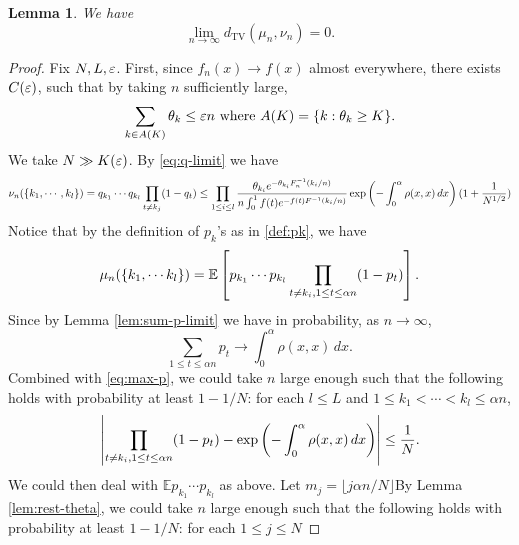 \documentclass[10pt]{article}
\DeclareMathOperator{\TV}{\mathrm{TV}}
\newtheorem{lem}[thm]{Lemma}
\numberwithin{equation}{section}
\begin{document}
    \begin{lem}
        We have 
        \begin{equation}
            \lim_{n\to \infty} d_{\TV} (\mu_n,\nu_n) =0.
        \end{equation}
    \end{lem}

    \begin{proof}
        Fix $N,L,\varepsilon$. 
        First, since $f_n(x)\to f(x)$ almost everywhere, there exists $C(\varepsilon)$, such that by taking $n$ sufficiently large, 
        \begin{equation}
            \sum_{k\in A(K)} \theta_k \leq \varepsilon n \mbox{ where } A(K)=\{k:\theta_k\geq K\}.
        \end{equation}
        We take $N\gg K(\varepsilon)$. By \eqref{eq:q-limit} we have
        \begin{equation}\label{eq:nu-nound}
            \nu_{n}(\{k_1,\cdots,k_l\})=q_{k_1}\cdots q_{k_l}\prod_{t\neq k_j} (1-q_{t})\leq \prod_{1\leq i\leq l} \frac{\theta_{k_i}e^{-\theta_{k_i}F_n^{-1}(k_i/n)}}{n\int_0^1f(t)e^{-f(t)F^{-1}(k_i/n)}} \exp\left(-\int_0^\alpha \rho (x,x) \,dx \right) (1+\frac{1}{N^{1/2}})
        \end{equation}       
        Notice that by the definition of $p_k$'s as in \eqref{def:pk}, we have
        \begin{equation}\label{eq:onlykifixed}
            \mu_n(\{k_1,\cdots k_l\})=\mathbb E \left[ p_{k_1}\cdots p_{k_l} \prod_{t\neq k_i, 1\le t\le \alpha n} (1-p_t) \right].
        \end{equation}
        Since by Lemma \ref{lem:sum-p-limit} we have in probability, as $n \to \infty$,
        \begin{equation}
            \sum_{1\le t\le \alpha n} p_t \to \int_0^\alpha \rho (x,x) \,dx .
        \end{equation}
        Combined with \eqref{eq:max-p}, we could take $n$ large enough such that the following holds with probability at least $1-1/N$: for each $l \leq L$ and $1\leq k_1<\cdots<k_l\leq \alpha n$,
        \begin{equation}\label{eq:other-not-fixed}
            \left | \prod_{t\neq k_i, 1\le t\le \alpha n} (1-p_t) - \exp\left(-\int_0^\alpha \rho (x,x) \,dx \right) \right | \leq \frac{1}{N} .
        \end{equation}
        We could then deal with $\mathbb  E p_{k_1}\cdots p_{k_l}$ as above. Let $m_j=\lfloor j\alpha n/N\rfloor$By Lemma \ref{lem:rest-theta}, we could take $n$ large enough such that the following holds with probability at least $1-1/N$: for each $1\leq j\leq N$

\end{proof}
\end{document}
